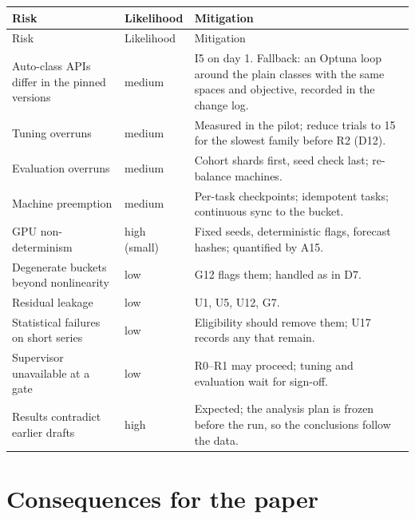 \documentclass[11pt,a4paper]{article}
\begin{document}
{\small
\begin{longtable}{@{}p{4.6cm} p{2.0cm} p{8.6cm}@{}}
\toprule
Risk & Likelihood & Mitigation \\
\midrule
\endfirsthead
\toprule
Risk & Likelihood & Mitigation \\
\midrule
\endhead
\bottomrule
\endfoot
Auto-class APIs differ in the pinned versions & medium & I5 on day 1. Fallback: an Optuna loop around the plain classes with the same spaces and objective, recorded in the change log. \\
Tuning overruns & medium & Measured in the pilot; reduce trials to 15 for the slowest family before R2 (D12). \\
Evaluation overruns & medium & Cohort shards first, seed check last; re-balance machines. \\
Machine preemption & medium & Per-task checkpoints; idempotent tasks; continuous sync to the bucket. \\
GPU non-determinism & high (small) & Fixed seeds, deterministic flags, forecast hashes; quantified by A15. \\
Degenerate buckets beyond nonlinearity & low & G12 flags them; handled as in D7. \\
Residual leakage & low & U1, U5, U12, G7. \\
Statistical failures on short series & low & Eligibility should remove them; U17 records any that remain. \\
Supervisor unavailable at a gate & low & R0--R1 may proceed; tuning and evaluation wait for sign-off. \\
Results contradict earlier drafts & high & Expected; the analysis plan is frozen before the run, so the conclusions follow the data. \\
\end{longtable}
}

\section{Consequences for the paper}\label{sec:paper}
\end{document}
